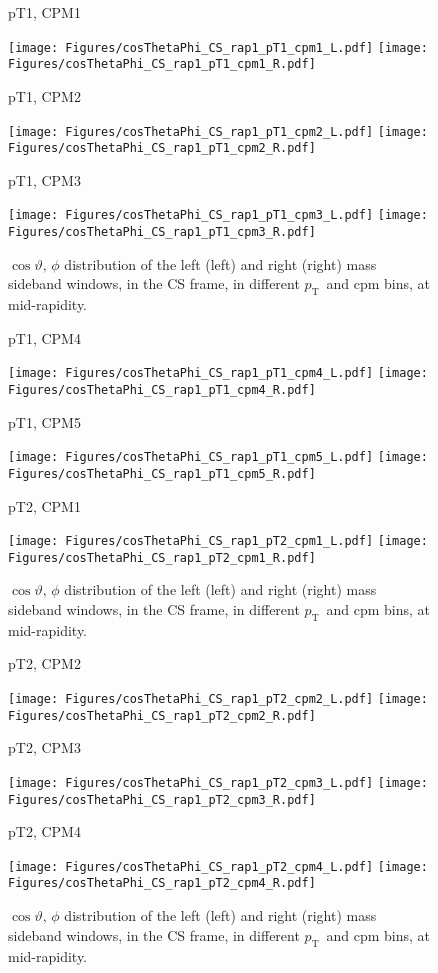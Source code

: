 \documentclass[12pt]{article}
\newcommand{\pt}{$p_{\mathrm{T}}$}
\begin{document}

\begin{figure}[htbp]
\centering
\caption{pT1, CPM1}
\texttt{[image: Figures/cosThetaPhi\_CS\_rap1\_pT1\_cpm1\_L.pdf]}
\texttt{[image: Figures/cosThetaPhi\_CS\_rap1\_pT1\_cpm1\_R.pdf]}
\caption{pT1, CPM2}
\texttt{[image: Figures/cosThetaPhi\_CS\_rap1\_pT1\_cpm2\_L.pdf]}
\texttt{[image: Figures/cosThetaPhi\_CS\_rap1\_pT1\_cpm2\_R.pdf]}
\caption{pT1, CPM3}
\texttt{[image: Figures/cosThetaPhi\_CS\_rap1\_pT1\_cpm3\_L.pdf]}
\texttt{[image: Figures/cosThetaPhi\_CS\_rap1\_pT1\_cpm3\_R.pdf]}
\caption{$\cos\vartheta,\,\phi$ distribution of the left (left) and
  right (right) mass sideband windows, in the CS frame, in different
  \pt\ and cpm bins, at mid-rapidity.}
\end{figure}
\clearpage

\begin{figure}[htbp]
\centering
\caption{pT1, CPM4}
\texttt{[image: Figures/cosThetaPhi\_CS\_rap1\_pT1\_cpm4\_L.pdf]}
\texttt{[image: Figures/cosThetaPhi\_CS\_rap1\_pT1\_cpm4\_R.pdf]}
\caption{pT1, CPM5}
\texttt{[image: Figures/cosThetaPhi\_CS\_rap1\_pT1\_cpm5\_L.pdf]}
\texttt{[image: Figures/cosThetaPhi\_CS\_rap1\_pT1\_cpm5\_R.pdf]}
\caption{pT2, CPM1}
\texttt{[image: Figures/cosThetaPhi\_CS\_rap1\_pT2\_cpm1\_L.pdf]}
\texttt{[image: Figures/cosThetaPhi\_CS\_rap1\_pT2\_cpm1\_R.pdf]}
\caption{$\cos\vartheta,\,\phi$ distribution of the left (left) and
  right (right) mass sideband windows, in the CS frame, in different
  \pt\ and cpm bins, at mid-rapidity.}
\end{figure}
\clearpage

\begin{figure}[htbp]
\centering
\caption{pT2, CPM2}
\texttt{[image: Figures/cosThetaPhi\_CS\_rap1\_pT2\_cpm2\_L.pdf]}
\texttt{[image: Figures/cosThetaPhi\_CS\_rap1\_pT2\_cpm2\_R.pdf]}
\caption{pT2, CPM3}
\texttt{[image: Figures/cosThetaPhi\_CS\_rap1\_pT2\_cpm3\_L.pdf]}
\texttt{[image: Figures/cosThetaPhi\_CS\_rap1\_pT2\_cpm3\_R.pdf]}
\caption{pT2, CPM4}
\texttt{[image: Figures/cosThetaPhi\_CS\_rap1\_pT2\_cpm4\_L.pdf]}
\texttt{[image: Figures/cosThetaPhi\_CS\_rap1\_pT2\_cpm4\_R.pdf]}
\caption{$\cos\vartheta,\,\phi$ distribution of the left (left) and
  right (right) mass sideband windows, in the CS frame, in different
  \pt\ and cpm bins, at mid-rapidity.}
\end{figure}
\clearpage
\end{document}
